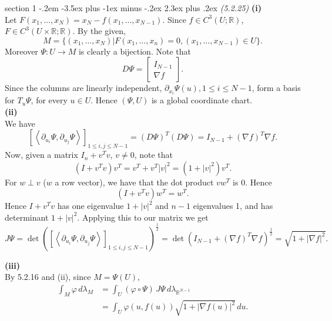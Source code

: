 \documentclass[12pt]{article}
\makeatletter
\theoremstyle{norm}
\newcommand{\R}[0]{\mathbb{R}}
\newcommand{\rc}[1]{\frac{1}{#1}}
\newcommand{\la}[0]{\lambda}
\newcommand{\ph}[0]{\varphi}
\newcommand{\pa}[1]{\left( {#1} \right)}
\newcommand{\an}[1]{\left\langle {#1}\right\rangle}
\newcommand{\subprob}[1]{\noindent\textbf{#1}\\}
\newenvironment{problem}{\@startsection
       {section}
       {1}
       {-.2em}
       {-3.5ex plus -1ex minus -.2ex}
       {2.3ex plus .2ex}
       {\pagebreak[3]%
       \large\bf\noindent{Problem }
       }
       }
       {%
       }
\makeatother
\begin{document}
\begin{problem}{\it (5.2.25)}
\subprob{(i)}
Let $F(x_1,\ldots, x_N)=x_N-f(x_1,\ldots, x_{N-1})$. Since $f\in C^3(U;\R)$, $F\in C^3(U\times \R;\R)$. 
By the given,
\[
M=\{(x_1,\ldots, x_N)|F(x_1,\ldots, x_n)=0, (x_1,\ldots, x_{N-1})\in U\}.
\]
Moreover $\Psi:U\to M$ is clearly a bijection. 
Note that 
\[
D\Psi=\left[\begin{array}{c}
I_{N-1}\\
\hline \nabla f\end{array}\right].
\]
Since the columns are linearly independent, $\partial_{x_i}\Psi(u),1\le i\le N-1$, form a basis for $T_u\Psi$, for every $u\in U$. 
Hence $(\Psi, U)$ is a global coordinate chart.\\

\subprob{(ii)}
We have 
\[[\an{\partial_{u_i} \Psi,\partial_{u_j} \Psi}]_{1\le i,j\le N-1}=(D\Psi)^T(D\Psi)=I_{N-1}+(\nabla f)^T\nabla f.\]
Now, given a matrix $I_n+v^Tv$, $v\ne 0$, note that
\[
(I+v^Tv){v^T}=v^T+{v^T|v|^2}=(1+|v|^2){v^T}.
\]
For $w\perp v$ ($w$ a row vector), we have that the dot product $vw^T$ is 0. Hence
\[
(I+v^Tv)w^T=w^T.
\]
Hence $I+v^Tv$ has one eigenvalue $1+|v|^2$ and $n-1$ eigenvalues 1, and has determinant $1+|v|^2$. Applying this to our matrix we get
\[
J\Psi=\det\pa{[\an{\partial_{u_i} \Psi,\partial_{u_j} \Psi}]_{1\le i,j\le N-1}}^{\rc 2}=\det(I_{N-1}+(\nabla f)^T\nabla f)^{\rc 2}=\sqrt{1+|\nabla f|^2}.
\]

\subprob{(iii)}
By 5.2.16 and (ii), since $M=\Psi(U)$,
\begin{align*}
\int_M \ph\,d\la_M&=\int_U (\ph\circ \Psi)\,J\Psi\,d\la_{\R^{N-1}}\\
&=\int_U \ph(u,f(u))\sqrt{1+|\nabla f(u)|^2}\,du.
\end{align*}
\end{problem}
\end{document}
